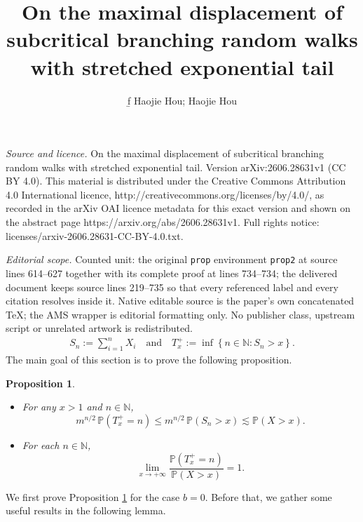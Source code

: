 \documentclass[10pt,a4paper]{amsart}
\newtheorem{prop}[thrm]{Proposition}
\numberwithin{equation}{section}
\begin{document}
\title[On the maximal displacement of subcritical branching random ]{On the maximal displacement of subcritical branching random walks with stretched exponential tail}
\author{f̱ Haojie Hou; Haojie Hou}
\date{}
\maketitle
\noindent\emph{Source and licence.} On the maximal displacement of subcritical branching random walks with stretched exponential tail. Version arXiv:2606.28631v1 (CC BY 4.0). This material is distributed under the Creative Commons Attribution 4.0 International licence, http://creativecommons.org/licenses/by/4.0/, as recorded in the arXiv OAI licence metadata for this exact version and shown on the abstract page https://arxiv.org/abs/2606.28631v1. Full rights notice: licenses/arxiv-2606.28631-CC-BY-4.0.txt.\par\smallskip
\noindent\textit{Editorial scope.} Counted unit: the original \texttt{prop} environment \texttt{prop2} at source lines 614--627 together with its complete proof at lines 734--734; the delivered document keeps source lines 219--735 so that every referenced label and every citation resolves inside it. Native editable source is the paper's own concatenated TeX; the AMS wrapper is editorial formatting only. No publisher class, upstream script or unrelated artwork is redistributed.
 	 \begin{align}\label{Def-of-stopping-time}
 	 	S_n := \sum_{i=1}^n X_i \quad \text{and} \quad T_x^+ := \inf\left\{n \in \mathbb{N} : S_n > x\right\}.
 	 \end{align}
 	 The main goal of this section is to prove the following proposition.
 
	\begin{prop}\label{prop1}
		\begin{itemize}
			\item[(i)] For any $x > 1$ and $n \in \mathbb{N}$,
			\[
			m^{n/2} \, \mathbb{P}\left(T_x^+ = n \right) \leq m^{n/2} \, \mathbb{P}\left(S_n > x \right) \lesssim \mathbb{P}(X > x).
			\]
			\item[(ii)] For each $n \in \mathbb{N}$,
			\[
			\lim_{x \to +\infty} \frac{\mathbb{P}(T_x^+ = n)}{\mathbb{P}(X > x)} = 1.
			\]
		\end{itemize}
	\end{prop}
	
	We first prove Proposition \ref{prop1} for the case $b = 0$. Before that, we gather some useful results in the following lemma.
	
\end{document}
